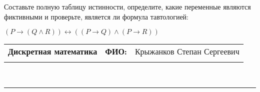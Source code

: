 \documentclass[10pt]{exam}
\newcommand{\class}{Дискретная математика}
\newcommand{\examdate}{}
\begin{document}
\begin{questions}
\begin{enumerate}[a)]
\end{enumerate}\question Составьте полную таблицу истинности, определите, какие переменные являются фиктивными и проверьте, является ли формула тавтологией:

$(P \rightarrow (Q \land R)) \leftrightarrow ((P \rightarrow Q) \land (P \rightarrow R))$

\end{questions}
\newpage
\begin{flushright}
\begin{tabular}{p{2.8in} r l}
\textbf{\class} & \textbf{ФИО:} &Крыжанков Степан Сергеевич
\\

\textbf{\examdate} &&\\
\end{tabular}\\
\end{flushright}
\rule[1ex]{\textwidth}{.1pt}
\end{document}
